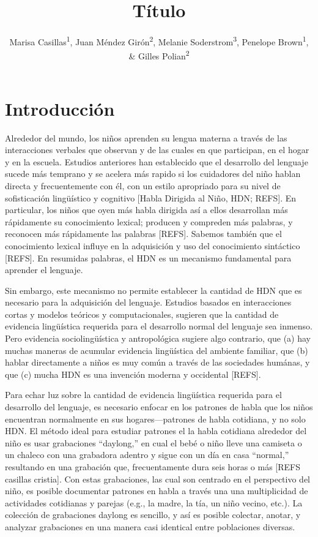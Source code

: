 \documentclass[
  english,
  ,man,floatsintext]{apa6}
\title{Título}
\author{Marisa Casillas\textsuperscript{1}, Juan Méndez Girón\textsuperscript{2}, Melanie Soderstrom\textsuperscript{3}, Penelope Brown\textsuperscript{1}, \& Gilles Polian\textsuperscript{2}}
\date{}
\affiliation{\vspace{0.5cm}\textsuperscript{1} Max Planck Institute for Psycholinguistics\\\textsuperscript{2} Centro de Investigaciones y Estudios Superiores en Antropología Social\\\textsuperscript{3} University of Manitoba}
\begin{document}
\maketitle

\hypertarget{introducciuxf3n}{%
\section{Introducción}\label{introducciuxf3n}}

Alrededor del mundo, los niños aprenden su lengua materna a través de las interacciones verbales que observan y de las cuales en que participan, en el hogar y en la escuela. Estudios anteriores han establecido que el desarrollo del lenguaje sucede más temprano y se acelera más rapido si los cuidadores del niño hablan directa y frecuentemente con él, con un estilo apropriado para su nivel de sofisticación lingüístico y cognitivo {[}Habla Dirigida al Niño, HDN; REFS{]}. En particular, los niños que oyen más habla dirigida así a ellos desarrollan más rápidamente su conocimiento lexical; producen y compreden más palabras, y reconocen más rápidamente las palabras {[}REFS{]}. Sabemos también que el conocimiento lexical influye en la adquisición y uso del conocimiento sintáctico {[}REFS{]}. En resumidas palabras, el HDN es un mecanismo fundamental para aprender el lenguaje.

Sin embargo, este mecanismo no permite establecer la cantidad de HDN que es necesario para la adquisición del lenguaje. Estudios basados en interacciones cortas y modelos teóricos y computacionales, sugieren que la cantidad de evidencia lingüística requerida para el desarrollo normal del lenguaje sea inmenso. Pero evidencia sociolingüística y antropológica sugiere algo contrario, que (a) hay muchas maneras de acumular evidencia lingüística del ambiente familiar, que (b) hablar directamente a niños es muy común a través de las sociedades humánas, y que (c) mucha HDN es una invención moderna y occidental {[}REFS{]}.

Para echar luz sobre la cantidad de evidencia lingüística requerida para el desarrollo del lenguaje, es necesario enfocar en los patrones de habla que los niños encuentran normalmente en sus hogares---patrones de habla cotidiana, y no solo HDN. El método ideal para estudiar patrones el la habla cotidiana alrededor del niño es usar grabaciones ``daylong,'' en cual el bebé o niño lleve una camiseta o un chaleco con una grabadora adentro y sigue con un día en casa ``normal,'' resultando en una grabación que, frecuentamente dura seis horas o más {[}REFS casillas cristia{]}. Con estas grabaciones, las cual son centrado en el perspectivo del niño, es posible documentar patrones en habla a través una una multiplicidad de actividades cotidianas y parejas (e.g., la madre, la tía, un niño vecino, etc.). La colección de grabaciones daylong es sencillo, y así es posible colectar, anotar, y analyzar grabaciones en una manera casi identical entre poblaciones diversas.
\end{document}
